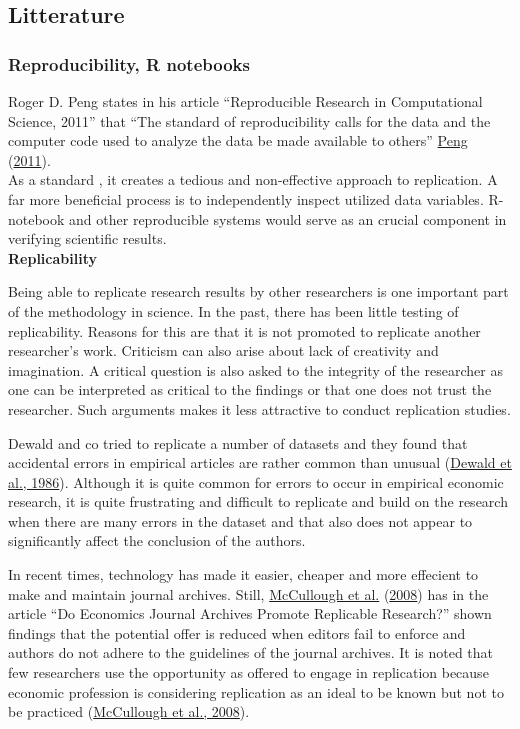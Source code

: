 \documentclass[
  12pt,
  norsk,
]{article}
\begin{document}
\hypertarget{litterature}{%
\subsection{Litterature}\label{litterature}}

\hypertarget{reproducibility-r-notebooks}{%
\subsubsection{Reproducibility, R
notebooks}\label{reproducibility-r-notebooks}}

Roger D. Peng states in his article ``Reproducible Research in
Computational Science, 2011'' that ``The standard of reproducibility
calls for the data and the computer code used to analyze the data be
made available to others'' \protect\hyperlink{ref-peng2011}{Peng}
(\protect\hyperlink{ref-peng2011}{2011}).\\
As a standard , it creates a tedious and non-effective approach to
replication. A far more beneficial process is to independently inspect
utilized data variables. R-notebook and other reproducible systems would
serve as an crucial component in verifying scientific results.\\

\textbf{Replicability}

Being able to replicate research results by other researchers is one
important part of the methodology in science. In the past, there has
been little testing of replicability. Reasons for this are that it is
not promoted to replicate another researcher's work. Criticism can also
arise about lack of creativity and imagination. A critical question is
also asked to the integrity of the researcher as one can be interpreted
as critical to the findings or that one does not trust the researcher.
Such arguments makes it less attractive to conduct replication studies.

Dewald and co tried to replicate a number of datasets and they found
that accidental errors in empirical articles are rather common than
unusual (\protect\hyperlink{ref-dewald1986}{Dewald et al., 1986}).
Although it is quite common for errors to occur in empirical economic
research, it is quite frustrating and difficult to replicate and build
on the research when there are many errors in the dataset and that also
does not appear to significantly affect the conclusion of the authors.

In recent times, technology has made it easier, cheaper and more
effecient to make and maintain journal archives. Still,
\protect\hyperlink{ref-mccullough2008}{McCullough et al.}
(\protect\hyperlink{ref-mccullough2008}{2008}) has in the article ``Do
Economics Journal Archives Promote Replicable Research?'' shown findings
that the potential offer is reduced when editors fail to enforce and
authors do not adhere to the guidelines of the journal archives. It is
noted that few researchers use the opportunity as offered to engage in
replication because economic profession is considering replication as an
ideal to be known but not to be practiced
(\protect\hyperlink{ref-mccullough2008}{McCullough et al., 2008}).
\end{document}
